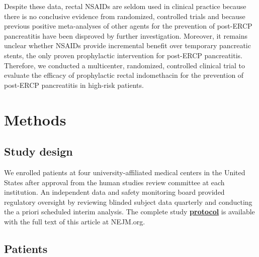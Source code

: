 \documentclass[
  10pt,
  letterpaper,
]{article}
\begin{document}
Despite these data, rectal NSAIDs are seldom used in clinical practice
because there is no conclusive evidence from randomized, controlled
trials\citep{dumonceau2010} and because previous positive meta-analyses
of other agents for the prevention of post-ERCP pancreatitis have been
disproved by further investigation.\citep{andriulli2000, andriulli2007}
Moreover, it remains unclear whether NSAIDs provide incremental benefit
over temporary pancreatic stents, the only proven prophylactic
intervention for post-ERCP
pancreatitis.\citep{tarnasky1998, fazel2003, singh2004} Therefore, we
conducted a multicenter, randomized, controlled clinical trial to
evaluate the efficacy of prophylactic rectal indomethacin for the
prevention of post-ERCP pancreatitis in high-risk patients.

\section{Methods}\label{methods}

\subsection{Study design}\label{study-design}

We enrolled patients at four university-affiliated medical centers in
the United States after approval from the human studies review committee
at each institution. An independent data and safety monitoring board
provided regulatory oversight by reviewing blinded subject data
quarterly and conducting the a priori scheduled interim analysis. The
complete study
\href{https://www.nejm.org/doi/suppl/10.1056/NEJMoa1111103/suppl_file/nejmoa1111103_protocol.pdf}{\textbf{protocol}}
is available with the full text of this article at NEJM.org.

\subsection{Patients}\label{patients}
\end{document}
